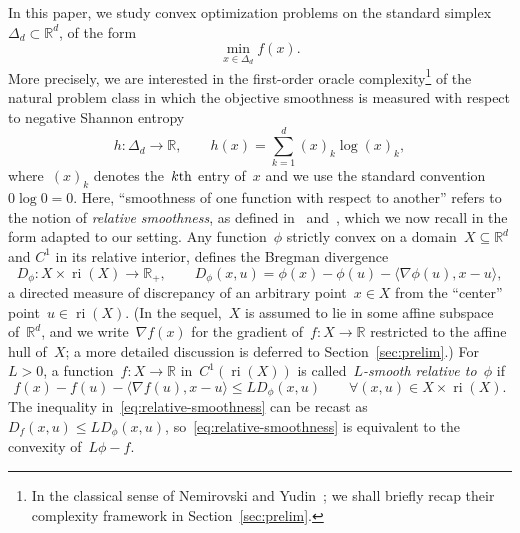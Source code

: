 \documentclass[11pt]{article}
\numberwithin{equation}{section}
\let\le\leqslant
\theoremstyle{remark}
\newcommand{\R}{\mathbb{R}}
\newcommand{\inner}[2]{\langle #1,#2\rangle}
\newcommand{\ri}{\operatorname{ri}}
\newcommand{\Simp}{\Delta_d}
\newcommand{\1}{\mathbf{1}}
\newcommand{\bnabla}{\nabla}
\begin{document}
In this paper, we study convex optimization problems on the standard simplex~$\Simp \subset \R^d$, of the form
\begin{equation}
\label{eq:intro-problem}
\min_{x\in \Simp} f(x).
\end{equation}
More precisely, we are interested in the first-order oracle complexity\footnote{In the classical sense of Nemirovski and Yudin~\cite{nemirovski1983problem}; we shall briefly recap their complexity framework in Section~\ref{sec:prelim}.} of the natural problem class in which the objective smoothness is measured with respect to negative Shannon entropy
\begin{equation}
\label{eq:intro-entropy}
h: \Simp \to \R, \qquad h(x) = \sum_{k=1}^d (x)_k \log (x)_k,
\end{equation}
where~$(x)_k$ denotes the~$k{\textup{th}}$ entry of~$x$ and we use the standard convention~$0 \log 0 = 0$.
Here, ``smoothness of one function with respect to another'' refers to the notion of {\em relative smoothness}, as defined in~\cite{BauschkeBolteTeboulle2017} and~\cite{LuFreundNesterov2018},
which we now recall in the form adapted to our setting. 
Any function~$\phi$ strictly convex on a domain~$X \subseteq \R^d$ and $C^1$ in its relative interior, defines the {Bregman divergence}
\[
D_{\phi}: X \times \ri(X) \to \R_+, 
\qquad
D_{\phi}(x,u) =  \phi(x) - \phi(u) - \langle \bnabla\phi(u), x-u \rangle,
\]
a directed measure of discrepancy of an arbitrary point~$x \in X$ from the ``center'' point~$u \in \ri(X)$. 
(In the sequel,~$X$ is assumed to lie in some affine subspace of~$\R^d$, and we write~$\bnabla f(x)$ for the gradient of~$f: X \to \R$ restricted to the affine hull of~$X$; a more detailed discussion is deferred to Section~\ref{sec:prelim}.)
For~$L>0$, a function~$f: X \to \R$ in~$C^1(\ri(X))$ is called~{\em $L$-smooth relative to~$\phi$} if
\begin{equation}
\label{eq:relative-smoothness}
f(x) - f(u) - \inner{\bnabla f(u)}{x-u} \le LD_{\phi}(x,u) 
\qquad \forall (x,u) \in X \times \ri(X).
\end{equation}
The inequality in~\eqref{eq:relative-smoothness} can be recast as~$D_f(x,u) \le LD_{\phi}(x,u)$, so~\eqref{eq:relative-smoothness} is equivalent to the convexity of~$L\phi - f$.
\end{document}
